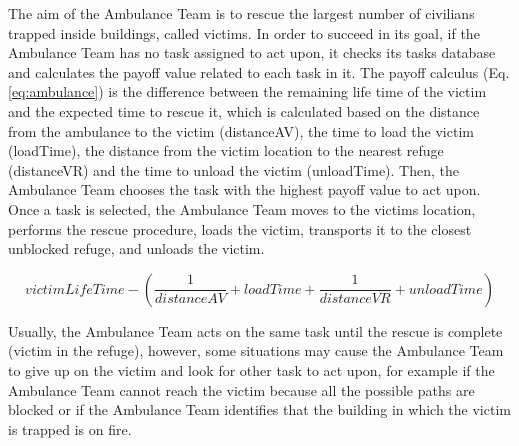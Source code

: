 The aim of the Ambulance Team is to rescue the largest number of civilians trapped inside buildings, called victims. In order to succeed in its goal, if the Ambulance Team has no task assigned to act upon, it checks its tasks database and calculates the payoff value related to each task in it. The payoff calculus (Eq. \ref{eq:ambulance}) is the difference between the remaining life time of the victim and the expected time to rescue it, which is calculated based on the distance from the ambulance to the victim (distanceAV), the time to load the victim (loadTime), the distance from the victim location to the nearest refuge (distanceVR) and the time to unload the victim (unloadTime). Then, the Ambulance Team chooses the task with the highest payoff value to act upon. Once a task is selected, the Ambulance Team moves to the victims location, performs the rescue procedure, loads the victim, transports it to the closest unblocked refuge, and unloads the victim.

\begin{equation}
\label{eq:ambulance}
victimLifeTime - \left(\frac{1}{distanceAV} + loadTime + \frac{1}{distanceVR} + unloadTime\right)
\end{equation}

Usually, the Ambulance Team acts on the same task until the rescue is complete (victim in the refuge), however, some situations may cause the Ambulance Team to give up on the victim and look for other task to act upon, for example if the Ambulance Team cannot reach the victim because all the possible paths are blocked or if the Ambulance Team identifies that the building in which the victim is trapped is on fire.
